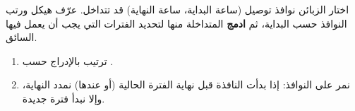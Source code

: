 \begin{statement}
اختار الزبائن نوافذ توصيل (ساعة البداية، ساعة النهاية) قد تتداخل. عرّف هيكل  ورتب النوافذ حسب البداية، ثم \textbf{ادمج} المتداخلة منها لتحديد الفترات التي يجب أن يعمل فيها السائق.
\end{statement}
\begin{stepsbox}\begin{enumerate}
\item ترتيب بالإدراج حسب .
\item نمر على النوافذ: إذا بدأت النافذة قبل نهاية الفترة الحالية (أو عندها) نمدد النهاية، وإلا نبدأ فترة جديدة.
\end{enumerate}\end{stepsbox}

